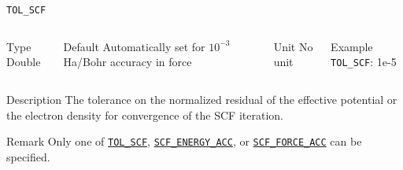 \documentclass[xcolor=dvipsnames,t]{beamer}
\begin{document}
\begin{frame}[allowframebreaks]{\texttt{TOL\_SCF}} \label{TOL_SCF}
\vspace*{-12pt}
\begin{columns}
\begin{block}{Type}
Double
\end{block}

\begin{block}{Default}
Automatically set for $10^{-3}$ Ha/Bohr accuracy in force
\end{block}

\begin{block}{Unit}
No unit
\end{block}

\begin{block}{Example}
\texttt{TOL\_SCF}: 1e-5
\end{block}
\end{columns}

\begin{block}{Description}
The tolerance on the normalized residual of the effective potential or the electron density for convergence of the SCF iteration. 
\end{block}

\begin{block}{Remark}
Only one of \hyperlink{TOL_SCF}{\texttt{TOL\_SCF}}, \hyperlink{SCF_ENERGY_ACC}{\texttt{SCF\_ENERGY\_ACC}}, or \hyperlink{SCF_FORCE_ACC}{\texttt{SCF\_FORCE\_ACC}} can be specified.
\end{block}

\end{frame}
\end{document}
